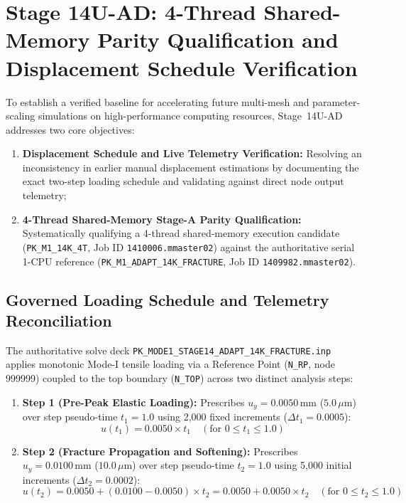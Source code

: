 \section{Stage 14U-AD: 4-Thread Shared-Memory Parity Qualification and Displacement Schedule Verification}
\label{sec:stage14uad_4thread_parity}

To establish a verified baseline for accelerating future multi-mesh and parameter-scaling simulations on high-performance computing resources, Stage~14U-AD addresses two core objectives:
\begin{enumerate}
  \item \textbf{Displacement Schedule and Live Telemetry Verification:} Resolving an inconsistency in earlier manual displacement estimations by documenting the exact two-step loading schedule and validating against direct node output telemetry;
  \item \textbf{4-Thread Shared-Memory Stage-A Parity Qualification:} Systematically qualifying a 4-thread shared-memory execution candidate (\texttt{PK\_M1\_14K\_4T}, Job ID \texttt{1410006.mmaster02}) against the authoritative serial 1-CPU reference (\texttt{PK\_M1\_ADAPT\_14K\_FRACTURE}, Job ID \texttt{1409982.mmaster02}).
\end{enumerate}

\subsection{Governed Loading Schedule and Telemetry Reconciliation}
\label{subsec:stage14uad_loading_schedule}

The authoritative solve deck \texttt{PK\_MODE1\_STAGE14\_ADAPT\_14K\_FRACTURE.inp} applies monotonic Mode-I tensile loading via a Reference Point (\texttt{N\_RP}, node 999999) coupled to the top boundary (\texttt{N\_TOP}) across two distinct analysis steps:
\begin{enumerate}
  \item \textbf{Step 1 (Pre-Peak Elastic Loading):} Prescribes $u_y = 0.0050\,\mathrm{mm}$ ($5.0\,\mu\mathrm{m}$) over step pseudo-time $t_1 = 1.0$ using 2,000 fixed increments ($\Delta t_1 = 0.0005$):
  \begin{equation}
    u(t_1) = 0.0050 \times t_1 \quad (\text{for } 0 \le t_1 \le 1.0)
    \label{eq:stage14uad_step1_ramp}
  \end{equation}
  \item \textbf{Step 2 (Fracture Propagation and Softening):} Prescribes $u_y = 0.0100\,\mathrm{mm}$ ($10.0\,\mu\mathrm{m}$) over step pseudo-time $t_2 = 1.0$ using 5,000 initial increments ($\Delta t_2 = 0.0002$):
  \begin{equation}
    u(t_2) = 0.0050 + (0.0100 - 0.0050) \times t_2 = 0.0050 + 0.0050 \times t_2 \quad (\text{for } 0 \le t_2 \le 1.0)
    \label{eq:stage14uad_step2_ramp}
  \end{equation}
\end{enumerate}

